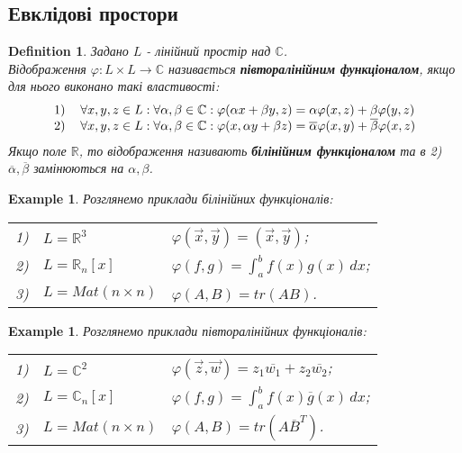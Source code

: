 \documentclass[a4paper, 10pt]{article}
\def\huge{\displaystyle}
\theoremstyle{theoremdd}
\theoremstyle{theoremdd}
\newtheorem{definition}[theorem]{Definition}
\theoremstyle{theoremdd}
\theoremstyle{theoremdd}
\newtheorem{example}[theorem]{Example}
\theoremstyle{theoremdd}
\theoremstyle{theoremdd}
\theoremstyle{theoremdd}
\theoremstyle{theoremdd}
\begin{document}
\subsection{Евклідові простори}
\begin{definition}
Задано $L$ - лінійний простір над $\mathbb{C}$.\\
Відображення $\varphi : L \times L \to \mathbb{C}$ називається \textbf{півторалінійним функціоналом}, якщо для нього виконано такі властивості:
\begin{align*}
\begin{tabular}{cl}
1) & $\forall x,y,z \in L: \forall \alpha,\beta \in \mathbb{C}: \varphi (\alpha x + \beta y, z) = \alpha \varphi (x,z) + \beta \varphi (y,z)$\\
2) & $\forall x,y,z \in L: \forall \alpha, \beta \in \mathbb{C}: \varphi (x, \alpha y + \beta z) = \overline{\alpha} \varphi (x,y) + \overline{\beta} \varphi (x,z)$\\
	\end{tabular}
\end{align*}
Якщо поле $\mathbb{R}$, то відображення називають \textbf{білінійним функціоналом} та в 2) $\overline{\alpha},\overline{\beta}$ замінюються на $\alpha,\beta$.
\end{definition}

\begin{example}
Розглянемо приклади білінійних функціоналів:\\
\begin{tabular}{cll}
1) & $L = \mathbb{R}^3$ & $\varphi(\vec{x},\vec{y}) = (\vec{x},\vec{y})$;\\
2) & $L = \mathbb{R}_n[x]$ & $\varphi(f,g) = \huge \int_a^b f(x)g(x)\,dx$;\\
3) & $L = Mat(n \times n)$ & $\varphi(A,B) = tr(AB)$.
\end{tabular}

\end{example}

\begin{example}
Розглянемо приклади півторалінійних функціоналів:\\
\begin{tabular}{cll}
1) & $L = \mathbb{C}^2$ & $\varphi(\vec{z},\vec{w}) = z_1 \overline{w_1} + z_2 \overline{w_2}$;\\
2) & $L = \mathbb{C}_n[x]$ & $\varphi(f,g) = \huge \int_a^b f(x) \overline{g}(x)\,dx$;\\
3) & $L = Mat(n \times n)$ & $\varphi(A,B) = tr(A \overline{B}^T)$.
\end{tabular}

\end{example}
\end{document}
